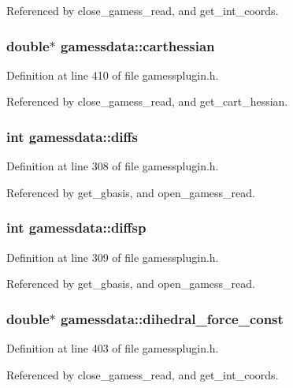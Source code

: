 Referenced by close\_\-gamess\_\-read, and get\_\-int\_\-coords.
\subsubsection{\setlength{\rightskip}{0pt plus 5cm}double$\ast$ gamessdata::carthessian}\label{structgamessdata_m53}




Definition at line 410 of file gamessplugin.h.

Referenced by close\_\-gamess\_\-read, and get\_\-cart\_\-hessian.
\subsubsection{\setlength{\rightskip}{0pt plus 5cm}int gamessdata::diffs}\label{structgamessdata_m10}




Definition at line 308 of file gamessplugin.h.

Referenced by get\_\-gbasis, and open\_\-gamess\_\-read.
\subsubsection{\setlength{\rightskip}{0pt plus 5cm}int gamessdata::diffsp}\label{structgamessdata_m11}




Definition at line 309 of file gamessplugin.h.

Referenced by get\_\-gbasis, and open\_\-gamess\_\-read.
\subsubsection{\setlength{\rightskip}{0pt plus 5cm}double$\ast$ gamessdata::dihedral\_\-force\_\-const}\label{structgamessdata_m51}




Definition at line 403 of file gamessplugin.h.

Referenced by close\_\-gamess\_\-read, and get\_\-int\_\-coords.

